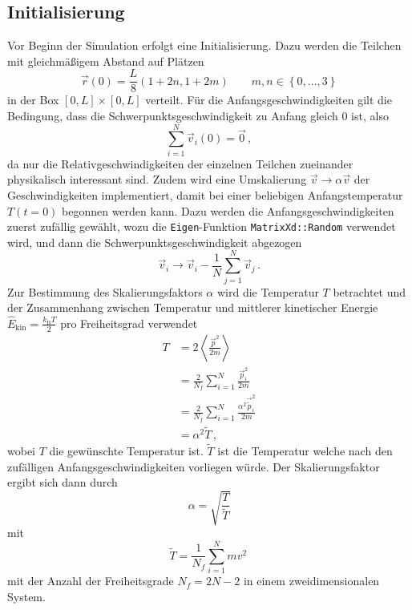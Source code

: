 \subsection*{Initialisierung}
Vor Beginn der Simulation erfolgt eine Initialisierung. Dazu werden die Teilchen mit gleichmäßigem Abstand auf Plätzen
\begin{equation*}
    \vec{r} \left(0\right) = \frac{L}{8} \left(1 + 2 n, 1 + 2 m\right) \qquad m, n \in \left\{0, \dots, 3\right\}
\end{equation*}
in der Box $\left[0, L\right] \times \left[0, L\right]$ verteilt.
Für die Anfangsgeschwindigkeiten gilt die Bedingung, dass die Schwerpunktsgeschwindigkeit zu Anfang gleich 0 ist,
also
\begin{equation*}
    \sum_{i = 1}^{N} \vec{v}_i \left(0\right) = \vec{0} \, ,
\end{equation*}
da nur die Relativgeschwindigkeiten der einzelnen Teilchen zueinander physikalisch interessant sind.
Zudem wird eine Umskalierung $\vec{v} \rightarrow \alpha \vec{v}$ der Geschwindigkeiten implementiert, damit bei einer
beliebigen Anfangstemperatur $T \left(t = 0\right)$ begonnen werden kann. 
Dazu werden die Anfangsgeschwindigkeiten zuerst zufällig gewählt, wozu
die \texttt{Eigen}-Funktion \texttt{MatrixXd::Random} verwendet wird, und dann die Schwerpunktsgeschwindigkeit abgezogen
\begin{equation*}
    \vec{v}_i \rightarrow \vec{v}_i - \frac{1}{N} \sum_{j = 1}^{N} \vec{v}_j \, .
\end{equation*}
Zur Bestimmung des Skalierungsfaktors $\alpha$ wird die Temperatur $T$ betrachtet und der Zusammenhang zwischen Temperatur und mittlerer kinetischer Energie $\hat{E}_{\text{kin}}=\frac{k_{\text{B}}T}{2}$ pro Freiheitsgrad verwendet
\begin{align*}
    T &= 2 \left\langle \frac{\vec{p}^2}{2 m}\right\rangle \\
      &= \frac{2}{N_f} \sum_{i = 1}^{N} \frac{\vec{p}_i^2}{2 m} \\
      &= \frac{2}{N_f} \sum_{i = 1}^{N} \frac{\alpha^2 \vec{\tilde{p}}_i^2}{2 m} \\
      &= \alpha^2 \tilde{T} \, ,
\end{align*}
wobei $T$ die gewünschte Temperatur ist. $\tilde{T}$ ist die Temperatur welche nach den zufälligen Anfangsgeschwindigkeiten vorliegen würde.
Der Skalierungsfaktor ergibt sich dann durch
\begin{equation*}
    \alpha = \sqrt{\frac{T}{\tilde{T}}}
\end{equation*}
mit 
\begin{equation*}
    \tilde{T} = \frac{1}{N_f} \sum_{i = 1}^{N} m v^2 \,
\end{equation*}
mit der Anzahl der Freiheitsgrade $N_f = 2N - 2$ in einem zweidimensionalen System.

